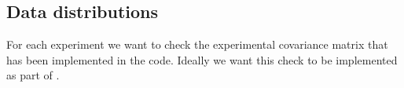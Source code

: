 \subsection{Data distributions}
\label{eq:data-distr}
For each experiment we want to check the experimental covariance matrix that has
been implemented in the \nnpdf code. Ideally we want this check to be
implemented as part of \valid. 